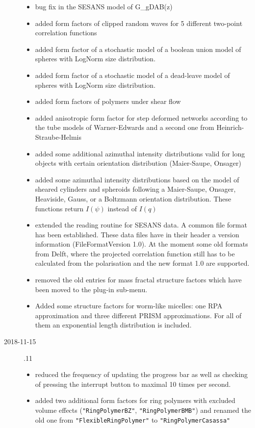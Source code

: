 \begin{description}
\begin{itemize}
    \item bug fix in the SESANS model of G\_gDAB(z)
    \item added form factors of clipped random waves for 5 different two-point correlation functions
    \item added form factor of a stochastic model of a boolean union model of spheres with LogNorm size distribution.
    \item added form factor of a stochastic model of a dead-leave model of spheres with LogNorm size distribution.
    \item added form factors of polymers under shear flow
    \item added anisotropic form factor for step deformed networks according to the tube models of Warner-Edwards and a second one from Heinrich-Straube-Helmis
     \item added some additional azimuthal intensity distributions valid for long objects with certain orientation distribution (Maier-Saupe, Onsager)
     \item added some azimuthal intensity distributions based on the model of sheared cylinders and spheroids following a Maier-Saupe, Onsager, Heaviside, Gauss, or a Boltzmann orientation distribution. These functions return $I(\psi)$ instead of $I(q)$
     \item extended the reading routine for SESANS data. A common file format has been established. These data files have in their header a version information (FileFormatVersion 1.0). At the moment some old formats from Delft, where the projected correlation function still has to be calculated from the polarisation and the new format 1.0 are supported.
    \item  removed the old entries for mass fractal structure factors which have been moved to the plug-in sub-menu.
    \item Added some structure factors for worm-like micelles: one RPA approximation and three different PRISM approximations. For all of them an exponential length distribution is included.
    \end{itemize}
\item[2018-11-15] .11
    \begin{itemize}
    \item reduced the frequency of updating the progress bar as well as checking of pressing the interrupt button to maximal 10 times per second.
    \item added two additional form factors for ring polymers with excluded volume effects (\texttt{"RingPolymerBZ"}, \texttt{"RingPolymerBMB"}) and renamed the old one from \texttt{"FlexibleRingPolymer"} to \texttt{"RingPolymerCasassa"}

\end{itemize}
\end{description}
